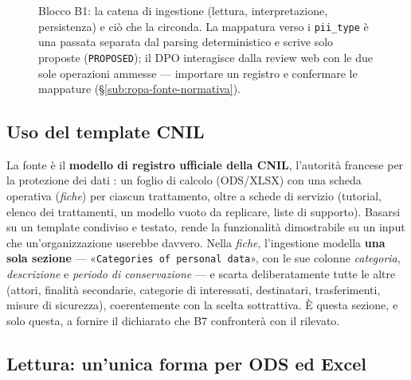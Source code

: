 \begin{figure}[htbp]
	\caption[Blocco B1: catena di ingestione del ROPA e mappatura assistita]{Blocco B1: la catena di ingestione (lettura, interpretazione, persistenza) e ciò che la circonda. La mappatura verso i \texttt{pii\_type} è una passata separata dal parsing deterministico e scrive solo proposte (\texttt{PROPOSED}); il DPO interagisce dalla review web con le due sole operazioni ammesse --- importare un registro e confermare le mappature (§\ref{sub:ropa-fonte-normativa}).}
	\label{fig:impl-b1-catena}
\end{figure}

\subsection{Uso del template CNIL}
\label{sub:impl-b1-formato}

La fonte è il \textbf{modello di registro ufficiale della CNIL}, l'autorità francese per la protezione dei dati \cite{cnilRegistreModeleBasique}: un foglio di calcolo (ODS/XLSX) con una scheda operativa (\emph{fiche}) per ciascun trattamento, oltre a schede di servizio (tutorial, elenco dei trattamenti, un modello vuoto da replicare, liste di supporto). Basarsi su un template condiviso e testato, rende la funzionalità dimostrabile su un input che un'organizzazione userebbe davvero. Nella \emph{fiche}, l'ingestione modella \textbf{una sola sezione} --- «\texttt{Categories of personal data}», con le sue colonne \emph{categoria}, \emph{descrizione} e \emph{periodo di conservazione} --- e scarta deliberatamente tutte le altre (attori, finalità secondarie, categorie di interessati, destinatari, trasferimenti, misure di sicurezza), coerentemente con la scelta sottrattiva. È questa sezione, e solo questa, a fornire il dichiarato che B7 confronterà con il rilevato.

\subsection{Lettura: un'unica forma per ODS ed Excel}
\label{sub:impl-b1-lettura}

